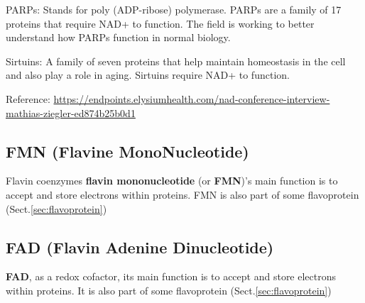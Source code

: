 \label{sec:PARP}
PARPs: Stands for poly (ADP-ribose) polymerase. PARPs are a family of 17 proteins that require NAD+ to function.
The field is working to better understand how PARPs function in normal biology.

\label{sec:sirtuins}
Sirtuins: A family of seven proteins that help maintain homeostasis in the cell and also play a role in aging. 
Sirtuins require NAD+ to function.

Reference: \url{https://endpoints.elysiumhealth.com/nad-conference-interview-mathias-ziegler-ed874b25b0d1}

\subsection{FMN (Flavine MonoNucleotide)}
\label{sec:FMN-coenzyme}

Flavin coenzymes {\bf flavin mononucleotide} (or {\bf FMN})'s main function is
to accept and store electrons within proteins. FMN is also part of some
flavoprotein (Sect.\ref{sec:flavoprotein})

\subsection{FAD (Flavin Adenine Dinucleotide)}
\label{sec:FAD}

{\bf FAD}, as a redox cofactor, its main function is to accept and store
electrons within proteins. It is also part of some flavoprotein
(Sect.\ref{sec:flavoprotein})

